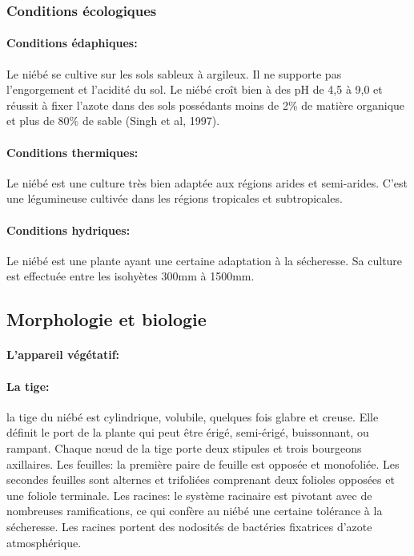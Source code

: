 \documentclass[a4paper,11pt]{article}
\begin{document}
\subsubsection{Conditions écologiques}

\paragraph{Conditions édaphiques:}

Le niébé se cultive sur les sols sableux à argileux. Il ne supporte
pas l’engorgement et l’acidité du sol. Le niébé croît bien à des pH de
4,5 à 9,0 et réussit à fixer l’azote dans des sols possédants moins de
2\% de matière organique et plus de 80\% de sable (Singh et al,
1997)\cite{Doggett_1988}.

\paragraph{Conditions thermiques:}

Le niébé est une culture très bien adaptée aux régions arides et
semi-arides. C’est une légumineuse cultivée dans les régions
tropicales et subtropicales\cite{Doggett_1988}.

\paragraph{Conditions hydriques:}

Le niébé est une plante ayant une certaine adaptation à la
sécheresse. Sa culture est effectuée entre les isohyètes 300mm à
1500mm\cite{Doggett_1988}.

\subsection{Morphologie et biologie}

  
\paragraph{L’appareil végétatif:}

\paragraph{La tige:} la tige du niébé est cylindrique, volubile, quelques fois
glabre et creuse. Elle définit le port de la plante qui peut être
érigé, semi-érigé, buissonnant, ou rampant. Chaque nœud de la tige
porte deux stipules et trois bourgeons axillaires.  Les feuilles: la
première paire de feuille est opposée et monofoliée. Les secondes
feuilles sont alternes et trifoliées comprenant deux folioles opposées
et une foliole terminale.  Les racines: le système racinaire est
pivotant avec de nombreuses ramifications, ce qui confère au niébé une
certaine tolérance à la sécheresse. Les racines portent des nodosités
de bactéries fixatrices d’azote atmosphérique\cite{Doggett_1988}.
\end{document}
